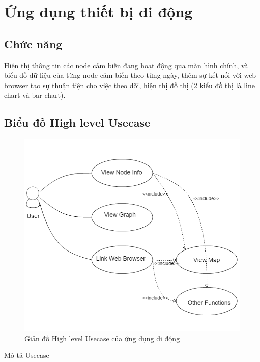 \section{Ứng dụng thiết bị di động}

\subsection{Chức năng}
Hiện thị thông tin các node cảm biến đang hoạt động qua màn hình chính, và biểu đồ dữ liệu của từng node cảm biến theo từng ngày, thêm sự kết nối với web browser tạo sự thuận tiện cho việc theo dõi, hiện thị đồ thị (2 kiểu đồ thị là line chart và bar chart).

\subsection{Biểu đồ High level Usecase}

\begin{center}
\begin{figure}[htp]
\centering    
\includegraphics[width=1\textwidth]{app_usecase}
\caption[Giản đồ High level Usecase của ứng dụng di động]{Giản đồ High level Usecase của ứng dụng di động}
\label{fig:app_usecase}
\end{figure}
\end{center}



Mô tả Usecase

